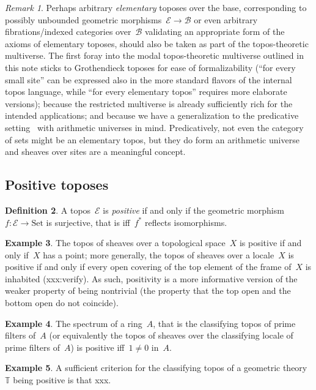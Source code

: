 \documentclass[oneside,reqno]{amsart}
\theoremstyle{definition}
\newtheorem{defn}{Definition}[section]
\newtheorem{ex}[defn]{Example}
\theoremstyle{plain}
\theoremstyle{remark}
\newtheorem{rem}[defn]{Remark}
\newcommand{\E}{\mathcal{E}}
\newcommand{\B}{\mathcal{B}}
\newcommand{\TT}{\mathbb{T}}
\newcommand{\Set}{\mathrm{Set}}
\renewcommand{\_}{\mathpunct{.}\,}
\newcommand{\?}{\,{:}\,}
\begin{document}
\begin{rem}Perhaps arbitrary \emph{elementary} toposes over the base, corresponding to
possibly unbounded geometric morphisms~$\E \to \B$ or even arbitrary
fibrations/indexed categories over~$\B$ validating an appropriate form of the
axioms of elementary toposes, should also be
taken as part of the topos-theoretic multiverse. The first foray into the
modal topos-theoretic multiverse outlined in this note
sticks to Grothendieck toposes for ease of
formalizability (``for every small site'' can be expressed also in the more
standard flavors of the internal topos language, while ``for every elementary
topos'' requires more elaborate versions); because the restricted multiverse
is already sufficiently rich for the intended applications; and because we have
a generalization to the predicative setting~\cite{crosilla:xxx} with arithmetic
universes in mind. Predicatively, not even the category of sets might be an
elementary topos, but they do form an arithmetic universe and sheaves over
sites are a meaningful concept.
\end{rem}


\subsection{Positive toposes}

\begin{defn}A topos~$\E$ is \emph{positive} if and only if the geometric
morphism~$f : \E \to \Set$ is surjective, that is iff~$f^*$ reflects
isomorphisms.\end{defn}

\begin{ex}The topos of sheaves over a topological space~$X$ is positive if and
only if~$X$ has a point; more generally, the topos of sheaves over a locale~$X$
is positive if and only if every open covering of the top element of the frame
of~$X$ is inhabited (xxx:verify). As such, positivity is a more informative
version of the weaker property of being nontrivial (the property that the top open
and the bottom open do not coincide).\end{ex}

\begin{ex}The spectrum of a ring~$A$, that is the classifying topos of prime
filters of~$A$ (or equivalently the topos of sheaves over the classifying
locale of prime filters of~$A$) is positive iff~$1 \neq 0$ in~$A$.\end{ex}

\begin{ex}A sufficient criterion for the classifying topos of a geometric
theory~$\TT$ being positive is that xxx.\end{ex}
\end{document}
